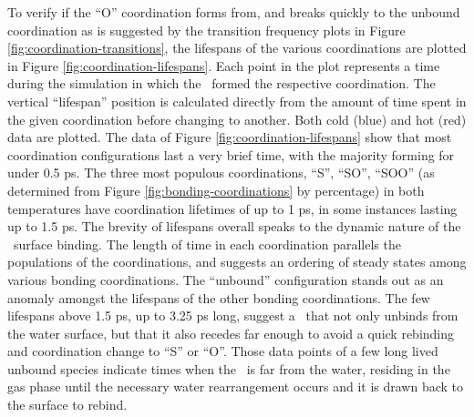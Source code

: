 To verify if the ``O'' coordination forms from, and breaks quickly to the unbound coordination as is suggested by the transition frequency plots in Figure \ref{fig:coordination-transitions}, the lifespans of the various coordinations are plotted in Figure \ref{fig:coordination-lifespans}. Each point in the plot represents a time during the simulation in which the \suldiox~formed the respective coordination. The vertical ``lifespan'' position is calculated directly from the amount of time spent in the given coordination before changing to another. Both cold (blue) and hot (red) data are plotted. The data of Figure \ref{fig:coordination-lifespans} show that most coordination configurations last a very brief time, with the majority forming for under 0.5 ps. The three most populous coordinations, ``S'', ``SO'', ``SOO'' (as determined from Figure \ref{fig:bonding-coordinations} by percentage) in both temperatures have coordination lifetimes of up to 1 ps, in some instances lasting up to 1.5 ps. The brevity of lifespans overall speaks to the dynamic nature of the \suldiox~surface binding. The length of time in each coordination parallels the populations of the coordinations, and suggests an ordering of steady states among various bonding coordinations. The ``unbound'' configuration stands out as an anomaly amongst the lifespans of the other bonding coordinations. The few lifespans above 1.5 ps, up to 3.25 ps long, suggest a \suldiox~that not only unbinds from the water surface, but that it also recedes far enough to avoid a quick rebinding and coordination change to ``S'' or ``O''. Those data points of a few long lived unbound species indicate times when the \suldiox~is far from the water, residing in the gas phase until the necessary water rearrangement occurs and it is drawn back to the surface to rebind.

